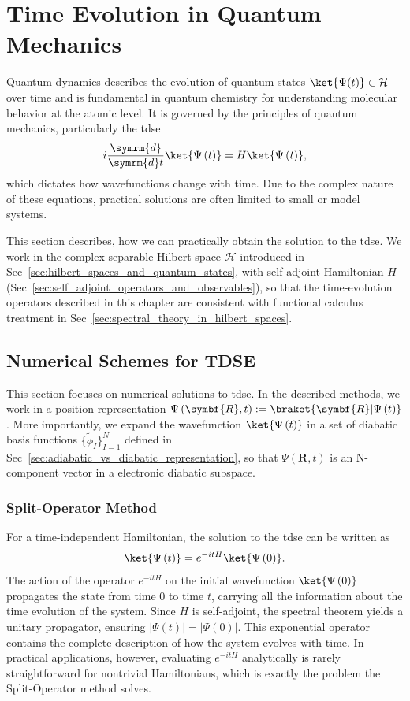 \chapter{Time Evolution in Quantum Mechanics}\label{sec:time_evolution}
Quantum dynamics describes the evolution of quantum states $\ket{\Psi(t)}\in\mathcal{H}$ over time and is fundamental in quantum chemistry for understanding molecular behavior at the atomic level. It is governed by the principles of quantum mechanics, particularly the \acrfull{tdse}
\begin{equation}\label{eq:tdse}
i\frac{\symrm{d}}{\symrm{d}t}\ket{\Psi\left(t\right)}=H\ket{\Psi\left(t\right)},
\end{equation}
which dictates how wavefunctions change with time. Due to the complex nature of these equations, practical solutions are often limited to small or model systems.

This section describes, how we can practically obtain the solution to the \acrshort{tdse}. We work in the complex separable Hilbert space $\mathcal{H}$ introduced in Sec~\ref{sec:hilbert_spaces_and_quantum_states}, with self-adjoint Hamiltonian $H$ (Sec~\ref{sec:self_adjoint_operators_and_observables}), so that the time-evolution operators described in this chapter are consistent with functional calculus treatment in Sec~\ref{sec:spectral_theory_in_hilbert_spaces}.
\section{Numerical Schemes for TDSE}\label{sec:numerical_schemes_for_time_dependent_schrodinger_equation}
This section focuses on numerical solutions to \acrshort{tdse}. In the described methods, we work in a position representation $\Psi\left(\symbf{R},t\right):=\braket{\symbf{R}\vert\Psi\left(t\right)}$. More importantly, we expand the wavefunction $\ket{\Psi\left(t\right)}$ in a set of diabatic basis functions $\lbrace\tilde\phi_I\rbrace_{I=1}^N$ defined in Sec~\ref{sec:adiabatic_vs_diabatic_representation}, so that $\Psi\left(\symbf{R},t\right)$ is an N-component vector in a electronic diabatic subspace.
\subsection{Split-Operator Method}\label{sec:split_operator_method}
For a time-independent Hamiltonian, the solution to the \acrshort{tdse} can be written as
\begin{equation}\label{eq:tdse_propagator}
\ket{\Psi\left(t\right)}=e^{-i t H}\ket{\Psi\left(0\right)}.
\end{equation}
The action of the operator $e^{-i t H}$ on the initial wavefunction $\ket{\Psi\left(0\right)}$ propagates the state from time $0$ to time $t$, carrying all the information about the time evolution of the system. Since $H$ is self-adjoint, the spectral theorem yields a unitary propagator, ensuring $\lvert\Psi(t)\rvert=\lvert\Psi(0)\rvert$. This exponential operator contains the complete description of how the system evolves with time. In practical applications, however, evaluating $e^{-i t H}$ analytically is rarely straightforward for nontrivial Hamiltonians, which is exactly the problem the Split-Operator method solves.

